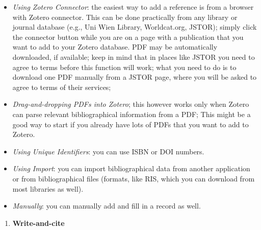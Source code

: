 \documentclass[
]{book}
\providecommand{\tightlist}{%
  \setlength{\itemsep}{0pt}\setlength{\parskip}{0pt}}
\begin{document}
\begin{itemize}
\tightlist
\item
  \emph{Using Zotero Connector}: the easiest way to add a reference is from a browser with Zotero connector. This can be done practically from any library or journal database (e.g., Uni Wien Library, Worldcat.org, JSTOR); simply click the connector button while you are on a page with a publication that you want to add to your Zotero database. PDF may be automatically downloaded, if available; keep in mind that in places like JSTOR you need to agree to terms before this function will work; what you need to do is to download one PDF manually from a JSTOR page, where you will be asked to agree to terms of their services;
\item
  \emph{Drag-and-dropping PDFs into Zotero}; this however works only when Zotero can parse relevant bibliographical information from a PDF; This might be a good way to start if you already have lots of PDFs that you want to add to Zotero.
\item
  \emph{Using Unique Identifiers}: you can use ISBN or DOI numbers.
\item
  \emph{Using Import}: you can import bibliographical data from another application or from bibliographical files (formats, like RIS, which you can download from most libraries as well).
\item
  \emph{Manually}: you can manually add and fill in a record as well.
\end{itemize}

\begin{enumerate}
\def\labelenumi{\arabic{enumi}.}
\setcounter{enumi}{1}
\tightlist
\item
  \textbf{Write-and-cite}
\end{enumerate}
\end{document}
